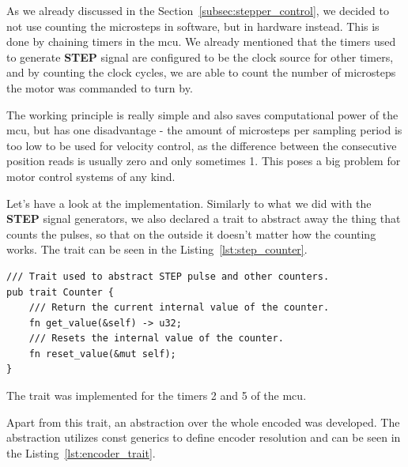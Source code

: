 As we already discussed in the Section~\ref{subsec:stepper_control}, we decided to not use counting the microsteps in software, but in hardware instead.
This is done by chaining timers in the \acs{mcu}.
We already mentioned that the timers used to generate \textbf{STEP} signal are configured to be the clock source for other timers, and by counting the clock cycles, we are able to count the number of microsteps the motor was commanded to turn by.

The working principle is really simple and also saves computational power of the \acs{mcu}, but has one disadvantage - the amount of microsteps per sampling period is too low to be used for velocity control, as the difference between the consecutive position reads is usually zero and only sometimes 1.
This poses a big problem for motor control systems of any kind.

Let's have a look at the implementation.
Similarly to what we did with the \textbf{STEP} signal generators, we also declared a trait to abstract away the thing that counts the pulses, so that on the outside it doesn't matter how the counting works.
The trait can be seen in the Listing~\ref{lst:step_counter}.

\begin{lstlisting}[caption={Counter trait for counting STEP pulses.},label=lst:step_counter]
/// Trait used to abstract STEP pulse and other counters.
pub trait Counter {
    /// Return the current internal value of the counter.
    fn get_value(&self) -> u32;
    /// Resets the internal value of the counter.
    fn reset_value(&mut self);
}
\end{lstlisting}
The trait was implemented for the timers 2 and 5 of the \acs{mcu}.

Apart from this trait, an abstraction over the whole encoded was developed.
The abstraction utilizes const generics to define encoder resolution and can be seen in the Listing~\ref{lst:encoder_trait}.

